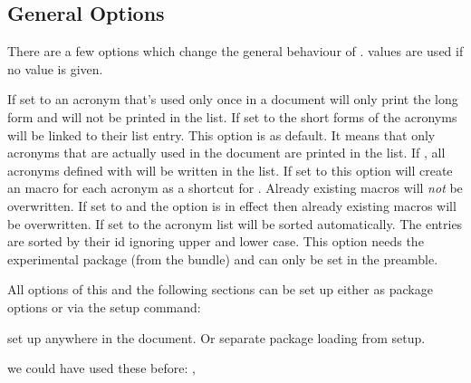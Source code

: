 \documentclass[DIV10,toc=index,toc=bib]{cnpkgdoc}
\begin{document}
\subsection{General Options}
There are a few options which change the general behaviour of \acro.
 values are used if no value is given.
\begin{beschreibung}
  If set to  an
 acronym that's used only once in a document will only print the long form and
 will not be printed in the list.
  If set to 
 the short forms of the acronyms will be linked to their list entry.
  This option is 
 as default. It means that only acronyms that are actually used in the document
 are printed in the list. If , all acronyms defined with 
 will be written in the list.
  If set to  this
 option will create an macro  for each acronym as a shortcut for
 .  Already existing macros will \emph{not} be overwritten.
  If set to  and
 the option  is in effect then already existing macros will be
 overwritten.
  If set to  the
 acronym list will be sorted automatically. The entries are sorted by their
 \acs{id} ignoring upper and lower case. This option needs the experimental
 package  (from the  bundle) and can only
 be set in the preamble.
\end{beschreibung}

All options of this and the following sections can be set up either as package
options or via the setup command:
\begin{beschreibung}
  set up \acro anywhere in the document. Or separate
 package loading from setup.
\end{beschreibung}

\begin{beispiel}
 we could have used these before: \nato, \ny
\end{beispiel}
\end{document}

